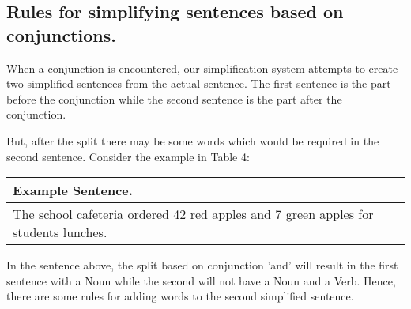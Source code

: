 \documentclass[11pt]{article}
\begin{document}
\subsection{Rules for simplifying sentences based on conjunctions.}
 When a conjunction is encountered, our simplification system attempts to create two simplified sentences from the actual sentence. The first sentence is the part before the conjunction while the second sentence is the part after the conjunction.

But, after the split there may be some words which would be required in the second sentence. Consider the example in Table 4:

\begin{table}[h!]
\centering
\begin{tabular}{ | m{25em} | }
\hline
 \textbf{Example Sentence.}\\
\hline
The school cafeteria ordered 42 red apples and 7 green apples for students lunches.\\
\hline
\end{tabular}
\label{table:4}
\end{table}

In the sentence above, the split based on conjunction 'and' will result in the first sentence with a Noun while the second will not have a Noun and a Verb. Hence, there are some rules for adding words to the second simplified sentence.
\end{document}
